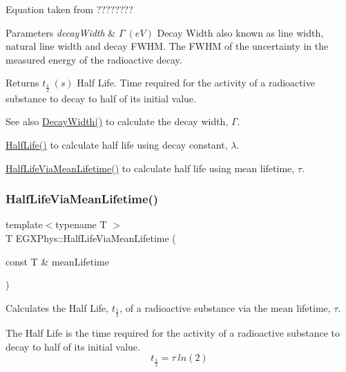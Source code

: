 Equation taken from ????????


\begin{DoxyParams}{Parameters}
{\em decay\+Width} & $\Gamma\ (eV)$ Decay Width also known as line width, natural line width and decay F\+W\+HM. The F\+W\+HM of the uncertainty in the measured energy of the radioactive decay. \\
\hline
\end{DoxyParams}
\begin{DoxyReturn}{Returns}
$t_{\frac{1}{2}}\ (s)$ Half Life. Time required for the activity of a radioactive substance to decay to half of its initial value. 
\end{DoxyReturn}
\begin{DoxySeeAlso}{See also}
\hyperlink{group___decay_width_gae232ec8bb39710131be898c057a25620}{Decay\+Width()} to calculate the decay width, $\Gamma$. 

\hyperlink{group___half_life_ga21d268f154fb91c1c556bbfa7fe83ac1}{Half\+Life()} to calculate half life using decay constant, $\lambda$. 

\hyperlink{group___half_life_gacddef16b62e98b214ec8dd8af7da7dce}{Half\+Life\+Via\+Mean\+Lifetime()} to calculate half life using mean lifetime, $\tau$. 
\end{DoxySeeAlso}
\mbox{\label{group___half_life_gacddef16b62e98b214ec8dd8af7da7dce}} 
\subsubsection{\texorpdfstring{Half\+Life\+Via\+Mean\+Lifetime()}{HalfLifeViaMeanLifetime()}}
{\footnotesize\ttfamily template$<$typename T $>$ \\
T E\+G\+X\+Phys\+::\+Half\+Life\+Via\+Mean\+Lifetime (\begin{DoxyParamCaption}\item[{const T \&}]{mean\+Lifetime }\end{DoxyParamCaption})}



Calculates the Half Life, $t_{\frac{1}{2}}$, of a radioactive substance via the mean lifetime, $\tau$. 

The Half Life is the time required for the activity of a radioactive substance to decay to half of its initial value. \[t_{\frac{1}{2}}= \tau \ ln(2)\]

